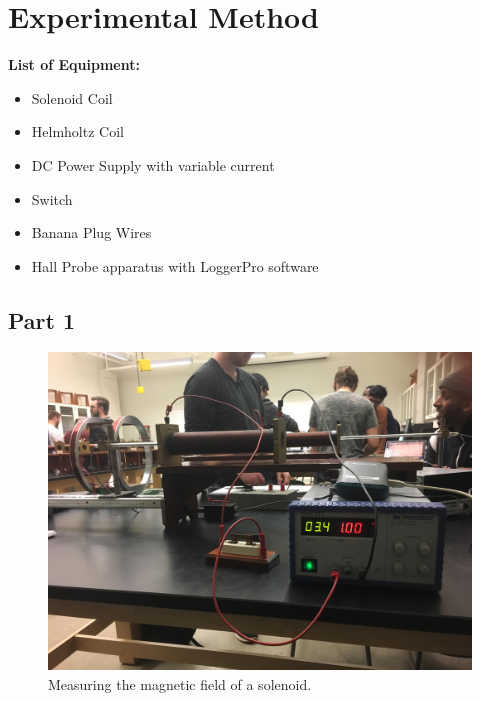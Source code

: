 \documentclass[letterpaper]{article}
\begin{document}
\section{Experimental Method}



\textbf{List of Equipment:}
\begin{itemize}
  \item Solenoid Coil
  \item Helmholtz Coil
  \item DC Power Supply with variable current
  \item Switch
  \item Banana Plug Wires
  \item Hall Probe apparatus with LoggerPro software
\end{itemize}

\subsection{Part 1}

\begin{figure}[H]
    \centering
    \includegraphics[width=.6\textwidth]{p1-1.jpg}
    \caption{Measuring the magnetic field of a solenoid.}
\end{figure}
\end{document}
